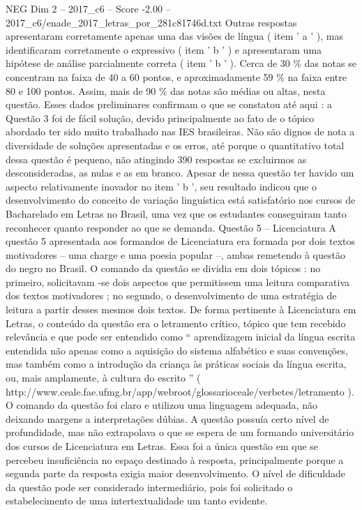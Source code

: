 \begin{textsample}{NEG Dim 2 – 2017\_c6 – Score -2.00 – 2017\_c6/enade\_2017\_letras\_por\_281c81746d.txt}
Outras respostas apresentaram corretamente apenas uma das visões de língua ( item ' a ' ), mas identificaram corretamente o expressivo ( item ' b ' ) e apresentaram uma hipótese de análise parcialmente correta ( item ' b ' ).
Cerca de 30 \% das notas se concentram na faixa de 40 a 60 pontos, e aproximadamente 59 \% na faixa entre 80 e 100 pontos.
Assim, mais de 90 \% das notas são médias ou altas, nesta questão.
Esses dados preliminares confirmam o que se constatou até aqui : a Questão 3 foi de fácil solução, devido principalmente ao fato de o tópico abordado ter sido muito trabalhado nas IES brasileiras.
Não são dignos de nota a diversidade de soluções apresentadas e os erros, até porque o quantitativo total dessa questão é pequeno, não atingindo 390 respostas se excluirmos as desconsideradas, as nulas e as em branco.
Apesar de nessa questão ter havido um aspecto relativamente inovador no item ' b ', seu resultado indicou que o desenvolvimento do conceito de variação linguística está satisfatório nos cursos de Bacharelado em Letras no Brasil, uma vez que os estudantes conseguiram tanto reconhecer quanto responder ao que se demanda.
Questão 5 – Licenciatura A questão 5 apresentada aos formandos de Licenciatura era formada por dois textos motivadores – uma charge e uma poesia popular –, ambas remetendo à questão do negro no Brasil.
O comando da questão se dividia em dois tópicos : no primeiro, solicitavam -se dois aspectos que permitissem uma leitura comparativa dos textos motivadores ; no segundo, o desenvolvimento de uma estratégia de leitura a partir desses mesmos dois textos.
De forma pertinente à Licenciatura em Letras, o conteúdo da questão era o letramento crítico, tópico que tem recebido relevância e que pode ser entendido como “ aprendizagem inicial da língua escrita entendida não apenas como a aquisição do sistema alfabético e suas convenções, mas também como a introdução da criança às práticas sociais da língua escrita, ou, mais amplamente, à cultura do escrito ” ( http://www.ceale.fae.ufmg.br/app/webroot/glossarioceale/verbetes/letramento ).
O comando da questão foi claro e utilizou uma linguagem adequada, não deixando margens a interpretações dúbias.
A questão possuía certo nível de profundidade, mas não extrapolava o que se espera de um formando universitário dos cursos de Licenciatura em Letras.
Essa foi a única questão em que se percebeu insuficiência no espaço destinado à resposta, principalmente porque a segunda parte da resposta exigia maior desenvolvimento.
O nível de dificuldade da questão pode ser considerado intermediário, pois foi solicitado o estabelecimento de uma intertextualidade um tanto evidente.

\end{textsample}
